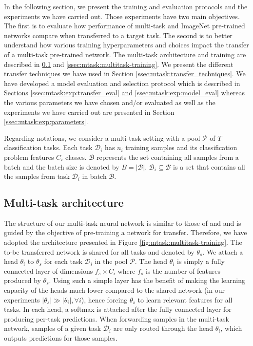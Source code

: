 In the following section, we present the training and evaluation protocols and the experiments we have carried out. Those experiments have two main objectives. The first is to evaluate how performance of multi-task and ImageNet pre-trained networks compare when transferred to a target task. The second is to better understand how various training hyperparameters and choices impact the transfer of a multi-task pre-trained network. The multi-task architecture and training are described in \ref{ssec:mtask:multitask-architecture} and \ref{ssec:mtask:multitask-training}. We present the different transfer techniques we have used in Section \ref{ssec:mtask:transfer_techniques}. We have developed a model evaluation and selection protocol which is described in Sections \ref{ssec:mtask:exp:transfer_eval} and \ref{ssec:mtask:exp:model_eval} whereas the various parameters we have chosen and/or evaluated as well as the experiments we have carried out are presented in Section \ref{ssec:mtask:exp:parameters}. 

Regarding notations, we consider a multi-task setting with a pool $\mathcal{P}$ of $T$ classification tasks. Each task $\mathcal{D}_i$ has $n_{i}$ training samples and its classification problem features $C_{i}$ classes. $\mathcal{B}$ represents the set containing all samples from a batch and the batch size is denoted by $B = \left|\mathcal{B}\right|$. $\mathcal{B}_{i} \subseteq \mathcal{B}$ is a set that contains all the samples from task $\mathcal{D}_i$ in batch $\mathcal{B}$. 

\subsection{Multi-task architecture}
\label{ssec:mtask:multitask-architecture}

The structure of our multi-task neural network is similar to those of \cite{shang2019and} and \cite{strezoski2019many} and is guided by the objective of pre-training a network for transfer. Therefore, we have adopted the architecture presented in Figure \ref{fig:mtask:multitask-training}. The to-be transferred network is shared for all tasks and denoted by $\theta_s$. We attach a head $\theta_i$ to $\theta_s$ for each task $\mathcal{D}_i$ in the pool $\mathcal{P}$. The head $\theta_i$ is simply a fully connected layer of dimensions $f_s\times C_{i}$ where $f_s$ is the number of features produced by $\theta_s$. Using such a simple layer has the benefit of making the learning capacity of the heads much lower compared to the shared network (in our experiments $|\theta_s| \gg |\theta_i|, \forall i$), hence forcing $\theta_s$ to learn relevant features for all tasks. In each head, a softmax is attached after the fully connected layer for producing per-task predictions. When forwarding samples in the multi-task network, samples of a given task $\mathcal{D}_i$ are only routed through the head $\theta_i$, which outputs predictions for those samples. 


